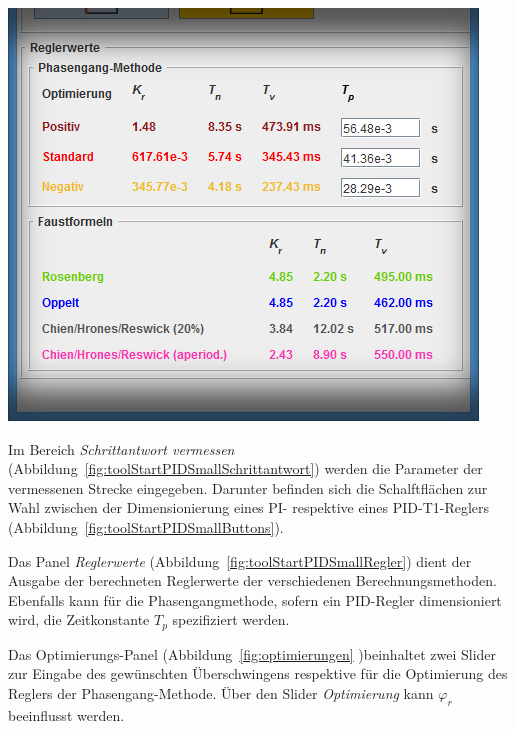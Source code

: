 \begin{minipage}[t][][b]{0.45\textwidth}
    \begin{minipage}[c][][b]{\textwidth}
        \centering
        \includegraphics[width=\textwidth]{images/toolStartPIDSmallRegler.jpg}
        \label{fig:toolStartPIDSmallRegler}
    \end{minipage}

\end{minipage}

Im             Bereich             \emph{Schrittantwort             vermessen}
(Abbildung~\ref{fig:toolStartPIDSmallSchrittantwort}) werden die Parameter der
vermessenen  Strecke eingegeben. Darunter  befinden sich  die Schalftfl\"achen
zur   Wahl   zwischen  der   Dimensionierung   eines   PI-  respektive   eines
PID-T1-Reglers (Abbildung~\ref{fig:toolStartPIDSmallButtons}).

Das  Panel   \emph{Reglerwerte}  (Abbildung~\ref{fig:toolStartPIDSmallRegler})
dient   der   Ausgabe   der    berechneten   Reglerwerte   der   verschiedenen
Berechnungsmethoden. Ebenfalls  kann f\"ur  die Phasengangmethode,  sofern ein
PID-Regler dimensioniert wird, die  Zeitkonstante $T_p$ spezifiziert werden.

Das  Optimierungs-Panel  (Abbildung~\ref{fig:optimierungen}  )beinhaltet  zwei
Slider  zur  Eingabe  des   gew\"unschten  \"Uberschwingens  respektive  f\"ur
die  Optimierung   des  Reglers  der  Phasengang-Methode. \"Uber   den  Slider
\emph{Optimierung} kann $\varphi_r$ beeinflusst werden.


